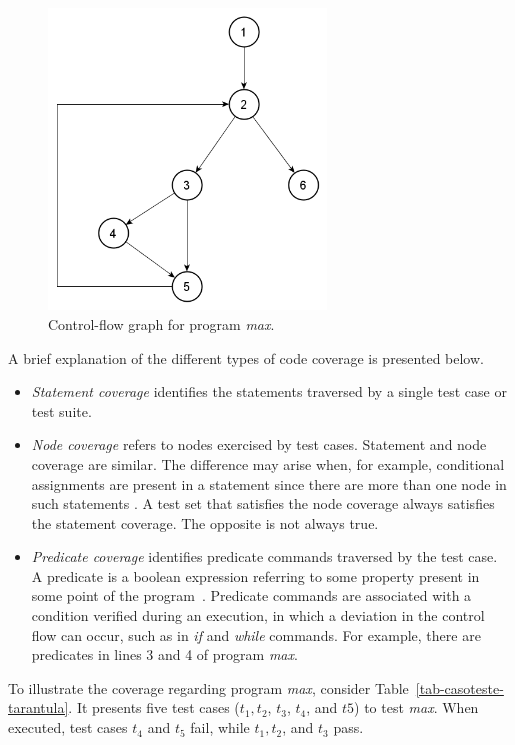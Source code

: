 \begin{figure}
  \centering
    \includegraphics[height=8cm]{figures/gfcMax.png}
  \caption{Control-flow graph for program \textit{max}.}
  \label{fig-gfcMax}
\end{figure}


A brief explanation of  the different types of code
coverage is presented below.

\begin{itemize}
  \item \textit{Statement coverage} identifies the statements traversed by a
    single test case or test suite.

  \item \textit{Node coverage} refers to nodes
    exercised by test cases.   Statement and node coverage are similar. The
    difference  may arise when, for example, conditional assignments are present
    in a statement since there are more than one node in such statements
    \cite{souza13adding}. A test set that satisfies the node coverage always
    satisfies the statement coverage. The opposite is not always true.

  \item \textit{Predicate coverage} identifies predicate commands traversed by
    the test case. A predicate is a boolean expression referring to
    some property present in some point of the program~\cite{zhang2009non}.
    Predicate commands are associated with a condition verified during an
    execution, in which a deviation in the control flow can occur, such as
    in \textit{if} and \textit{while} commands. For example, there are
    predicates in lines 3 and 4 of program \textit{max}.
\end{itemize}

To illustrate the  coverage regarding program \textit{max}, consider
Table~\ref{tab-casoteste-tarantula}. It presents five test cases ($t_1, t_2$,
$t_3$, $t_4$, and $t5$) to test  \textit{max}. When executed, test cases $t_4$
and $t_5$ fail, while $t_1, t_2$, and $t_3$ pass.

